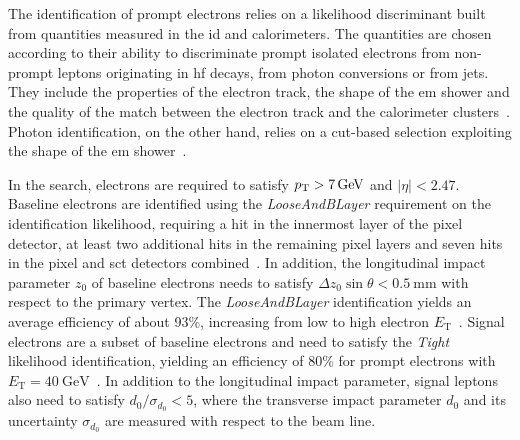 The identification of prompt electrons relies on a likelihood discriminant built from quantities measured in the \gls{id} and calorimeters. The quantities are chosen according to their ability to discriminate prompt isolated electrons from non-prompt leptons originating in \eg \gls{hf} decays, from photon conversions or from jets. They include the properties of the electron track, the shape of the \gls{em} shower and the quality of the match between the electron track and the calorimeter clusters~\cite{PERF-2017-01}. Photon identification, on the other hand, relies on a cut-based selection exploiting the shape of the \gls{em} shower~\cite{EGAM-2018-01}.

In the \onelepton search, electrons are required to satisfy $p_{\textrm{T}} > \SI{7}{GeV}$ and $\vert\eta\vert<2.47$. Baseline electrons are identified using the \textit{LooseAndBLayer} requirement on the identification likelihood, requiring a hit in the innermost layer of the pixel detector, at least two additional hits in the remaining pixel layers and seven hits in the pixel and \gls{sct} detectors combined~\cite{PERF-2017-01}. In addition, the longitudinal impact parameter $z_0$ of baseline electrons needs to satisfy $\Delta z_0\sin\theta < \SI{0.5}{\milli\meter}$ with respect to the primary vertex. The \textit{LooseAndBLayer} identification yields an average efficiency of about 93\%, increasing from low to high electron $E_\mathrm{T}$~\cite{PERF-2017-01}. Signal electrons are a subset of baseline electrons and need to satisfy the \textit{Tight} likelihood identification, yielding an efficiency of 80\% for prompt electrons with $E_\mathrm{T}=\SI{40}{\GeV}$~\cite{PERF-2017-01}. In addition to the longitudinal impact parameter, signal leptons also need to satisfy $d_0/\sigma_{d_0} < 5$, where the transverse impact parameter $d_0$ and its uncertainty $\sigma_{d_0}$ are measured with respect to the beam line. 

